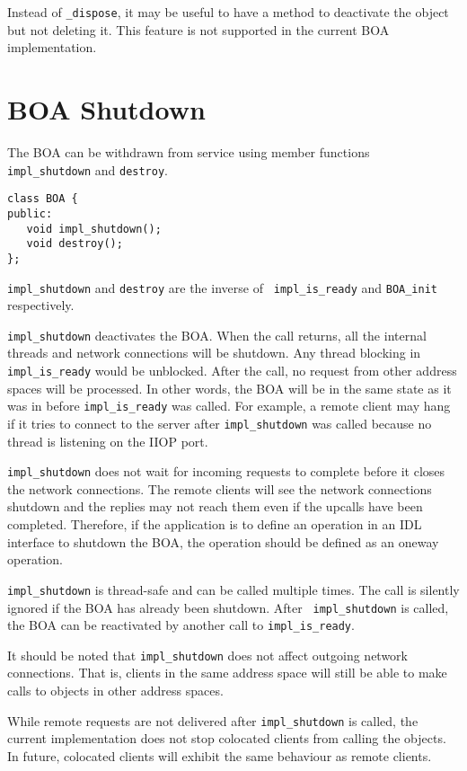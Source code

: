 \documentclass[11pt,twoside,onecolumn]{book}
\begin{document}
Instead of {\tt \_dispose}, it may be useful to have a method to deactivate
the object but not deleting it. This feature is not supported in the
current BOA implementation.

\section{BOA Shutdown}

The BOA can be withdrawn from service using member functions {\tt
impl\_shutdown} and {\tt destroy}.

{\small
\begin{verbatim}
class BOA {
public:
   void impl_shutdown();
   void destroy();
};
\end{verbatim}
}

{\tt impl\_shutdown} and {\tt destroy} are the inverse of {\tt
impl\_is\_ready} and {\tt BOA\_init} respectively.

{\tt impl\_shutdown} deactivates the BOA. When the call returns, all the
internal threads and network connections will be shutdown. Any thread
blocking in {\tt impl\_is\_ready} would be unblocked. After the call, no
request from other address spaces will be processed. In other words, the
BOA will be in the same state as it was in before {\tt impl\_is\_ready} was
called. For example, a remote client may hang if it tries to connect to the
server after {\tt impl\_shutdown} was called because no thread is listening
on the IIOP port. 

{\tt impl\_shutdown} does not wait for incoming requests to complete before
it closes the network connections. The remote clients will see the network
connections shutdown and the replies may not  reach them even if the
upcalls have been completed. Therefore, if the application is to define an
operation in an IDL interface to shutdown the BOA,  the operation should be
defined as an oneway operation.

{\tt impl\_shutdown} is thread-safe and can be called multiple times. The
call is silently ignored if the BOA has already been shutdown. After {\tt
impl\_shutdown} is called, the BOA can be reactivated by another call to
{\tt impl\_is\_ready}.

It should be noted that {\tt impl\_shutdown} does not affect outgoing
network connections. That is, clients in the same address space will
still be able to make calls to objects in other address spaces.

While remote requests are not delivered after {\tt impl\_shutdown} is
called, the current implementation does not stop colocated clients from
calling the objects. In future, colocated clients will exhibit the same
behaviour as remote clients.
\end{document}
